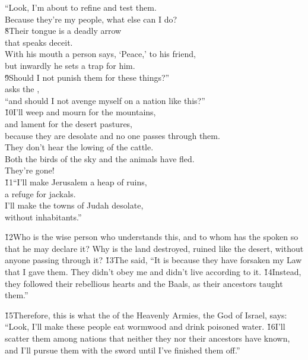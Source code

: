 \begin{poetry}
\poeml ``Look, I'm about to refine and test them. \\
\poemll    Because they're my people, what else can I do? \\
\poeml \v{8}Their tongue is a deadly arrow \\
\poemll    that speaks deceit. \\
\poeml With his mouth a person says, `Peace,' to his friend, \\
\poemll    but inwardly he sets a trap for him. \\
\poeml \v{9}Should I not punish them for these things?'' \\
\poemll    asks the , \\
\poemlll       ``and should I not avenge myself on a nation like this?'' \\
\poeml \v{10}I'll weep and mourn for the mountains, \\
\poemll    and lament for the desert pastures, \\
\poeml because they are desolate and no one passes through them. \\
\poemll    They don't hear the lowing of the cattle. \\
\poeml Both the birds of the sky and the animals have fled. \\
\poemll    They're gone! \\
\poeml \v{11}``I'll make Jerusalem a heap of ruins, \\
\poemll    a refuge for jackals. \\
\poeml I'll make the towns of Judah desolate, \\
\poemll    without inhabitants.''
\end{poetry}

\v{12}Who is the wise person who understands this, and to whom has the  spoken so that he may declare it? Why is the land destroyed, ruined like the desert, without anyone passing through it? \v{13}The  said, ``It is because they have forsaken my Law that I gave them. They didn't obey me and didn't live according to it. \v{14}Instead, they followed their rebellious hearts and the Baals, as their ancestors taught them.''

\v{15}Therefore, this is what the  of the Heavenly Armies, the God of Israel, says: ``Look, I'll make these people eat wormwood and drink poisoned water. \v{16}I'll scatter them among nations that neither they nor their ancestors have known, and I'll pursue them with the sword until I've finished them off.''


